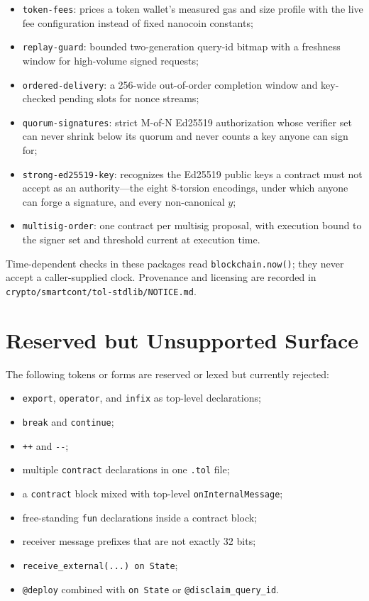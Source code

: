 \documentclass[12pt,oneside]{article}
\begin{document}
\begin{itemize}
\item \verb|token-fees|: prices a token wallet's measured gas and size
profile with the live fee configuration instead of fixed nanocoin constants;
\item \verb|replay-guard|: bounded two-generation query-id bitmap with a
freshness window for high-volume signed requests;
\item \verb|ordered-delivery|: a 256-wide out-of-order completion window and
key-checked pending slots for nonce streams;
\item \verb|quorum-signatures|: strict M-of-N Ed25519 authorization whose
verifier set can never shrink below its quorum and never counts a key anyone
can sign for;
\item \verb|strong-ed25519-key|: recognizes the Ed25519 public keys a
contract must not accept as an authority---the eight 8-torsion encodings,
under which anyone can forge a signature, and every non-canonical $y$;
\item \verb|multisig-order|: one contract per multisig proposal, with
execution bound to the signer set and threshold current at execution time.
\end{itemize}

Time-dependent checks in these packages read \verb|blockchain.now()|; they
never accept a caller-supplied clock. Provenance and licensing are recorded
in \verb|crypto/smartcont/tol-stdlib/NOTICE.md|.

\section{Reserved but Unsupported Surface}
The following tokens or forms are reserved or lexed but currently rejected:

\begin{itemize}
\item \verb|export|, \verb|operator|, and \verb|infix| as top-level
declarations;
\item \verb|break| and \verb|continue|;
\item \verb|++| and \verb|--|;
\item multiple \verb|contract| declarations in one \verb|.tol| file;
\item a \verb|contract| block mixed with top-level \verb|onInternalMessage|;
\item free-standing \verb|fun| declarations inside a contract block;
\item receiver message prefixes that are not exactly 32 bits;
\item \verb|receive_external(...) on State|;
\item \verb|@deploy| combined with \verb|on State| or
\verb|@disclaim_query_id|.
\end{itemize}
\end{document}
